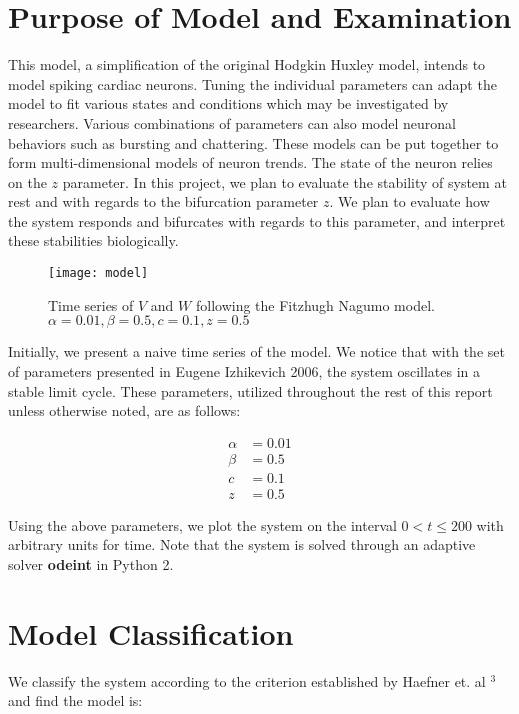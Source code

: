 \documentclass[11pt]{report}
\begin{document}
\section{Purpose of Model and Examination}

This model, a simplification of the original Hodgkin Huxley model, intends to model spiking cardiac neurons. Tuning the individual parameters can adapt the model to fit various states and conditions which may be investigated by researchers. Various combinations of parameters can also model neuronal behaviors such as bursting and chattering. These models can be put together to form multi-dimensional models of neuron trends. The state of the neuron relies on the $z$ parameter. 
In this project, we plan to evaluate the stability of system at rest and with regards to the bifurcation parameter $z$. We plan to evaluate how the system responds and bifurcates with regards to this parameter, and interpret these stabilities biologically. 


\begin{figure}[!ht]
  \caption{Time series of $V$ and $W$ following the Fitzhugh Nagumo model. $\alpha = 0.01, \beta = 0.5,c = 0.1,z = 0.5$}
  \centering
    \texttt{[image: model]}
\end{figure}

Initially, we present a naive time series of the model. We notice that with the set of parameters presented in Eugene Izhikevich 2006, the system oscillates in a stable limit cycle. These parameters, utilized throughout the rest of this report unless otherwise noted, are as follows:

$$ \begin{aligned} \alpha &= 0.01 \\ \beta &= 0.5 \\ c &= 0.1 \\ z &= 0.5 \end{aligned} $$

Using the above parameters, we plot the system on the interval $0 < t \leq 200$ with arbitrary units for time. Note that the system is solved through an adaptive solver \textbf{odeint} in Python 2. 


\section{Model Classification} %
\label{sub:model_classification}

We classify the system according to the criterion established by Haefner et. al $^{3}$ and find the model is:
\end{document}
